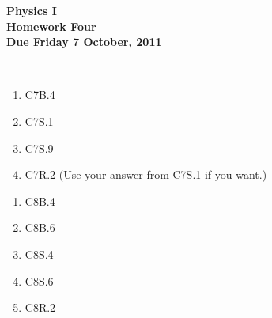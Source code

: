 \documentclass[12pt]{article}
\begin{document}
\pagestyle{empty}
 
\begin{center}
{\large {\bf Physics I}}\\
\medskip
{\large {\bf Homework Four}}\\
\medskip
{ {\bf Due Friday 7 October, 2011}}\\
\end{center}

\hspace{2mm}\\


\begin{enumerate}
\setlength{\itemsep}{-1mm}
  \item C7B.4
  \item C7S.1
  \item C7S.9
  \item C7R.2  (Use your answer from C7S.1 if you want.)
\end{enumerate}



\begin{enumerate}
\setlength{\itemsep}{-1mm}
  \item C8B.4
  \item C8B.6
  \item C8S.4
  \item C8S.6
  \item C8R.2
\end{enumerate}
\end{document}
